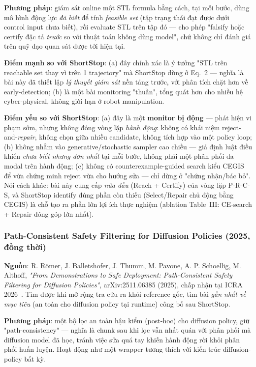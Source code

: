 \documentclass[a4paper,12pt]{article}
\begin{document}
\textbf{Phương pháp}: giám sát online một STL formula bằng cách, tại mỗi bước, dùng mô hình động lực \emph{đã biết} để tính \emph{feasible set} (tập trạng thái đạt được dưới control input chưa biết), rồi evaluate STL trên tập đó — cho phép "falsify hoặc certify đặc tả \emph{trước} so với thuật toán không dùng model", chứ không chỉ đánh giá trên quỹ đạo quan sát được tới hiện tại.

\textbf{Điểm mạnh so với ShortStop}: (a) đây chính xác là ý tưởng "STL trên reachable set thay vì trên 1 trajectory" mà ShortStop dùng ở Eq.~2 — nghĩa là bài này đã thiết lập \emph{lý thuyết giám sát} nền tảng trước, với phân tích chặt hơn về early-detection; (b) là một bài monitoring "thuần", tổng quát hơn cho nhiều hệ cyber-physical, không giới hạn ở robot manipulation.

\textbf{Điểm yếu so với ShortStop}: (a) đây là một \textbf{monitor bị động} — phát hiện vi phạm sớm, nhưng không đóng vòng lặp \emph{hành động}: không có khái niệm reject-and-\emph{repair}, không chọn giữa nhiều candidate, không tích hợp vào một policy loop; (b) không nhằm vào generative/stochastic sampler cao chiều — giả định luật điều khiển \emph{chưa biết nhưng đơn nhất} tại mỗi bước, không phải một phân phối đa modal trên hành động; (c) không có counterexample-guided search kiểu CEGIS để vừa chứng minh reject vừa cho hướng sửa — chỉ dừng ở "chứng nhận/bác bỏ". Nói cách khác: bài này cung cấp \emph{nửa đầu} (Reach + Certify) của vòng lặp P-R-C-S, và ShortStop identify đúng phần còn thiếu (Select/Repair chủ động bằng CEGIS) là chỗ tạo ra phần lớn lợi ích thực nghiệm (ablation Table~III: CE-search + Repair đóng góp lớn nhất).

\subsubsection{Path-Consistent Safety Filtering for Diffusion Policies (2025, đồng thời)}
\textbf{Nguồn}: R. Römer, J. Balletshofer, J. Thumm, M. Pavone, A. P. Schoellig, M. Althoff, \emph{"From Demonstrations to Safe Deployment: Path-Consistent Safety Filtering for Diffusion Policies"}, arXiv:2511.06385 (2025), chấp nhận tại ICRA 2026~\cite{pathconsistent2025}. Tìm được khi mở rộng tra cứu ra khỏi reference gốc, tìm bài \emph{gần nhất về mục tiêu} (an toàn cho diffusion policy tại runtime) công bố sau ShortStop.

\textbf{Phương pháp}: một bộ lọc an toàn hậu kiểm (post-hoc) cho diffusion policy, giữ "path-consistency" — nghĩa là chunk sau khi lọc vẫn nhất quán với phân phối mà diffusion model đã học, tránh việc sửa quá tay khiến hành động rời khỏi phân phối huấn luyện. Hoạt động như một wrapper tương thích với kiến trúc diffusion-policy bất kỳ.
\end{document}
